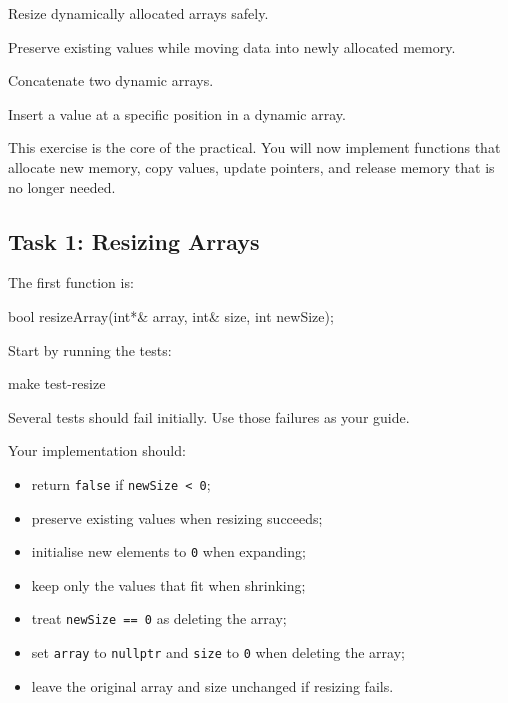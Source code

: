 \documentclass{csc2059practical}
\begin{document}

\begin{exerciseobjectives}
  \item Resize dynamically allocated arrays safely.
  \item Preserve existing values while moving data into newly allocated memory.
  \item Concatenate two dynamic arrays.
  \item Insert a value at a specific position in a dynamic array.
\end{exerciseobjectives}

This exercise is the core of the practical. You will now implement functions that allocate new memory, copy values, update pointers, and release memory that is no longer needed.

\subsection*{Task 1: Resizing Arrays}

The first function is:

\begin{cppcode}
bool resizeArray(int*& array,
                 int& size,
                 int newSize);
\end{cppcode}

Start by running the tests:

\begin{bashcode}
make test-resize
\end{bashcode}

Several tests should fail initially. Use those failures as your guide.

Your implementation should:
\begin{itemize}
  \item return \texttt{false} if \texttt{newSize < 0};
  \item preserve existing values when resizing succeeds;
  \item initialise new elements to \texttt{0} when expanding;
  \item keep only the values that fit when shrinking;
  \item treat \texttt{newSize == 0} as deleting the array;
  \item set \texttt{array} to \texttt{nullptr} and \texttt{size} to \texttt{0} when deleting the array;
  \item leave the original array and size unchanged if resizing fails.
\end{itemize}
\end{document}
